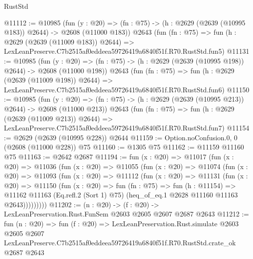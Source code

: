 \begin{lexlean}{RustStd}
\begin{coremodule}
@11112 := @10985
    (fun (y : @20) => (fn : @75) -> (h : @2629 (@2639 (@10995 @183)) @2644) -> @2608 (@11000 @183))
    @2643
    (fun (fn : @75) =>
    fun (h : @2629 (@2639 (@11009 @183)) @2644) =>
    LexLeanPreserve.C7b2515af0eddeea59726419a6840f51f.R70.RustStd.fun5)
@11131 := @10985
    (fun (y : @20) => (fn : @75) -> (h : @2629 (@2639 (@10995 @198)) @2644) -> @2608 (@11000 @198))
    @2643
    (fun (fn : @75) =>
    fun (h : @2629 (@2639 (@11009 @198)) @2644) =>
    LexLeanPreserve.C7b2515af0eddeea59726419a6840f51f.R70.RustStd.fun6)
@11150 := @10985
    (fun (y : @20) => (fn : @75) -> (h : @2629 (@2639 (@10995 @213)) @2644) -> @2608 (@11000 @213))
    @2643
    (fun (fn : @75) =>
    fun (h : @2629 (@2639 (@11009 @213)) @2644) =>
    LexLeanPreserve.C7b2515af0eddeea59726419a6840f51f.R70.RustStd.fun7)
@11154 := @2629 (@2639 (@10995 @228)) @2644
@11159 := Option.noConfusion.{0, 0} (@2608 (@11000 @228)) @75
@11160 := @1305 @75
@11162 := @11159 @11160 @75
@11163 := @2642 @2687
@11194 := fun (x : @20) =>
  @11017
    (fun (x : @20) =>
    @11036
      (fun (x : @20) =>
      @11055
        (fun (x : @20) =>
        @11074
          (fun (x : @20) =>
          @11093
            (fun (x : @20) =>
            @11112
              (fun (x : @20) =>
              @11131
                (fun (x : @20) =>
                @11150
                  (fun (x : @20) =>
                  fun (fn : @75) =>
                  fun (h : @11154) =>
                  @11162
                    @11163
                    (Eq.refl.{2} (Sort 1) @75)
                    (heq_of_eq.{1} @2628 @11160 @11163 @2643)))))))))
@11202 := (n : @20) -> (f : @20) -> LexLeanPreservation.Rust.FunSem @2603 @2605 @2607 @2687 @2643
@11212 := fun (n : @20) =>
  fun (f : @20) =>
  LexLeanPreservation.Rust.simulate
    @2603
    @2605
    @2607
    LexLeanPreserve.C7b2515af0eddeea59726419a6840f51f.R70.RustStd.crate_ok
    @2687
    @2643
\end{coremodule}
\end{lexlean}
